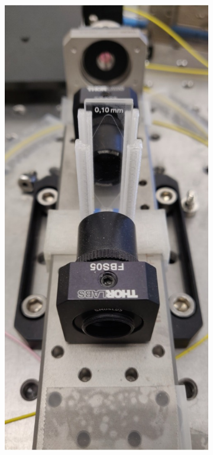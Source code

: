 \begin{figure}[t]
\begin{subfigure}[b]{0.3\textwidth}
        \caption{}
        \label{fig:Raman:1mmCS2pic}
    \end{subfigure}
    \hfill
    \begin{subfigure}[b]{0.3\textwidth}
        \centering
        \includegraphics[width=\textwidth]{figs/4-Raman/100umCS2.jpg}

\end{subfigure}
\end{figure}
